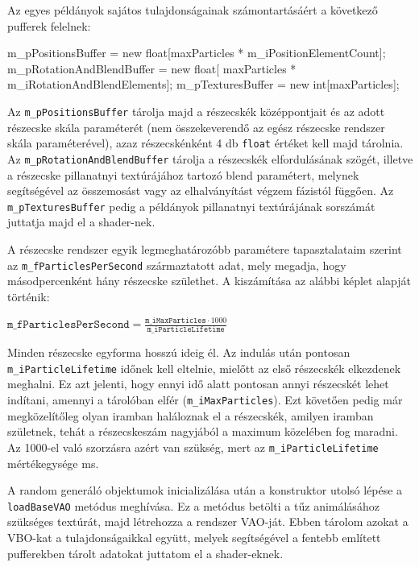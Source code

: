 Az egyes példányok sajátos tulajdonságainak számontartásáért a következő pufferek felelnek:
\begin{cpp}
m_pPositionsBuffer = new float[maxParticles * m_iPositionElementCount];
m_pRotationAndBlendBuffer = new float[
			maxParticles * m_iRotationAndBlendElements];
m_pTexturesBuffer = new int[maxParticles];
\end{cpp}
Az \texttt{m\_pPositionsBuffer} tárolja majd a részecskék középpontjait és az adott részecske skála paraméterét (nem összekeverendő az egész részecske rendszer skála paraméterével), azaz részecskénként 4 db \texttt{float} értéket kell majd tárolnia. Az \texttt{m\_pRotationAnd\-BlendBuffer} tárolja a részecskék elfordulásának szögét, illetve a részecske pillanatnyi textúrájához tartozó blend paramétert, melynek segítségével az összemosást vagy az elhalványítást végzem fázistól függően. Az \texttt{m\_pTexturesBuffer} pedig a példányok pillanatnyi textúrájának sorszámát juttatja majd el a shader-nek.

A részecske rendszer egyik legmeghatározóbb paramétere tapasztalataim szerint az \texttt{m\_fParticlesPerSecond} származtatott adat, mely megadja, hogy másodpercenként hány részecske születhet. A kiszámítása az alábbi képlet alapját történik:

\begingroup
\Large
\begin{center}
$ \texttt{m\_fParticlesPerSecond} = \frac{\texttt{m\_iMaxParticles} \cdot 1000}{\texttt{m\_iParticleLifetime}}$
\end{center}
\endgroup
Minden részecske egyforma hosszú ideig él. Az indulás után pontosan \texttt{m\_iParticle\-Lifetime} időnek kell eltelnie, mielőtt az első részecskék elkezdenek meghalni. Ez azt jelenti, hogy ennyi idő alatt pontosan annyi részecskét lehet indítani, amennyi a tárolóban elfér (\texttt{m\_iMaxParticles}). Ezt követően pedig már megközelítőleg olyan iramban haláloznak el a részecskék, amilyen iramban születnek, tehát a részecskeszám nagyjából a maximum közelében fog maradni. Az 1000-el való szorzásra azért van szükség, mert az \texttt{m\_iParticleLifetime} mértékegysége ms.

A random generáló objektumok inicializálása után a konstruktor utolsó lépése a \texttt{loadBaseVAO} metódus meghívása. Ez a metódus betölti a tűz animálásához szükséges textúrát, majd létrehozza a rendszer VAO-ját. Ebben tárolom azokat a VBO-kat a tulajdonságaikkal együtt, melyek segítségével a fentebb említett pufferekben tárolt adatokat juttatom el a shader-eknek. 

